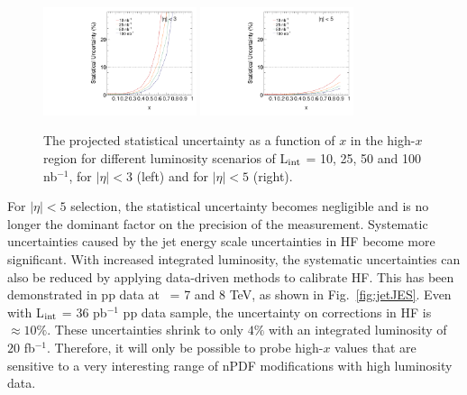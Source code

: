 \begin{figure}[h]
\begin{center}
\includegraphics[width= 0.4\textwidth]{figures/xStat_eta3_inclusiveJet.pdf}
\includegraphics[width= 0.4\textwidth]{figures/xStat_eta5_inclusiveJet.pdf}
\caption{The projected statistical uncertainty as a function of $x$ in the high-$x$ region 
for different luminosity scenarios of L$_{\rm int}$ = 10, 25, 50 and 100 nb$^{-1}$, 
for $|\eta| < 3$ (left) and for $|\eta| < 5$ (right).}
\label{fig:XreachWithPseudorapidity}
\end{center}
\end{figure}

For $|\eta| < 5$ selection, the statistical uncertainty becomes negligible
and is no longer the dominant factor on the precision of the measurement. 
Systematic uncertainties caused by the jet energy scale uncertainties in HF 
become more significant. With increased integrated luminosity, the systematic 
uncertainties can also be reduced by applying data-driven methods to calibrate HF.
This has been demonstrated in pp data at \roots\ = 7 and 8 TeV, as shown in 
Fig.~\ref{fig:jetJES}. Even with L$_{\rm int}$ = $36$ pb$^{-1}$ pp data sample, 
the uncertainty on corrections in HF is $\approx 10 \%$. These uncertainties shrink 
to only $4\%$ with an integrated luminosity of $20$ fb$^{-1}$. Therefore, it will 
only be possible to probe high-$x$ values that are sensitive to a very 
interesting range of nPDF modifications with high luminosity data.


